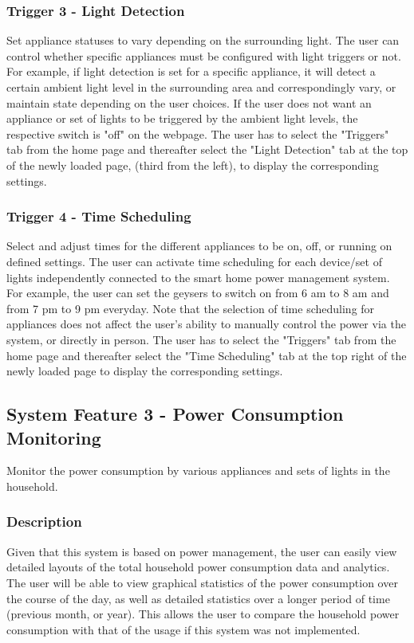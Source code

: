 \documentclass[11pt, a4paper]{article}
\newcounter{subsubsubsection}[subsubsection]
\begin{document}
	\subsubsection{Trigger 3 - Light Detection}
	Set appliance statuses to vary depending on the surrounding light.
	The user can control whether specific appliances must be configured with light triggers or not. For example, if light detection is set for a specific appliance, it will detect a certain ambient light level in the surrounding area and correspondingly vary, or maintain state depending on the user choices. If the user does not want an appliance or set of lights to be triggered by the ambient light levels, the respective switch is "off" on the webpage. 
	The user has to select the "Triggers" tab from the home page and thereafter select the "Light Detection" tab at the top of the newly loaded page, (third from the left), to display the corresponding settings.
	\subsubsection{Trigger 4 - Time Scheduling}
	Select and adjust times for the different appliances to be on, off, or running on defined settings. 
	The user can activate time scheduling for each device/set of lights independently connected to the smart home power management system. For example, the user can set the geysers to switch on from 6 am to 8 am and from 7 pm to 9 pm everyday. Note that the selection of time scheduling for appliances does not affect the user's ability to manually control the power via the system, or directly in person. 
	The user has to select the "Triggers" tab from the home page and thereafter select the "Time Scheduling" tab at the top right of the newly loaded page to display the corresponding settings.
	\subsection{System Feature 3 - Power Consumption Monitoring}
	Monitor the power consumption by various appliances and sets of lights in the household. 
	\subsubsection{Description}
	Given that this system is based on power management, the user can easily view detailed layouts of the total household power consumption data and analytics. The user will be able to view graphical statistics of the power consumption over the course of the day, as well as detailed statistics over a longer period of time (previous month, or year). This allows the user to compare the household power consumption with that of the usage if this system was not implemented. 
\end{document}
